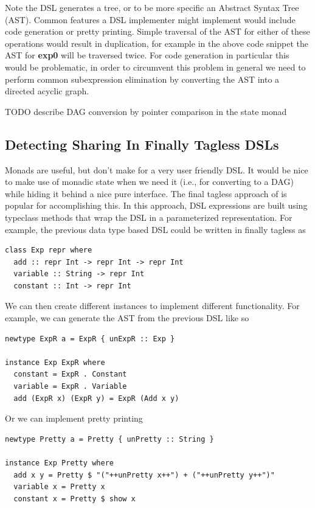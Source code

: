 \documentclass[runningheads]{llncs}
\begin{document}
Note the DSL generates a tree, or to be more specific an Abstract Syntax Tree
(AST). Common features a DSL implementer might implement would include code
generation or pretty printing. Simple traversal of the AST for either of these
operations would result in duplication, for example in the above code snippet
the AST for {\bf exp0} will be traversed twice. For code generation in
particular this would be problematic, in order to circumvent this problem in
general we need to perform common subexpression elimination by converting the
AST into a directed acyclic graph. %

TODO describe DAG conversion by pointer comparison in the state monad

\subsection{Detecting Sharing In Finally Tagless DSLs}

Monads are useful, but don't make for a very user friendly DSL. It would be nice
to make use of monadic state when we need it (i.e., for converting to a DAG)
while hiding it behind a nice pure interface. The final tagless approach of
\cite{carette:finallytagless} is popular for accomplishing this. In this
approach, DSL expressions are built using typeclass methods that wrap the DSL in
a parameterized representation. For example, the previous data type based DSL
could be written in finally tagless as

\begin{verbatim}
class Exp repr where
  add :: repr Int -> repr Int -> repr Int
  variable :: String -> repr Int
  constant :: Int -> repr Int
\end{verbatim}

We can then create different instances to implement different functionality.
For example, we can generate the AST from the previous DSL like so
\begin{verbatim}
newtype ExpR a = ExpR { unExpR :: Exp }

instance Exp ExpR where
  constant = ExpR . Constant
  variable = ExpR . Variable
  add (ExpR x) (ExpR y) = ExpR (Add x y)
\end{verbatim}

Or we can implement pretty printing
\begin{verbatim}
newtype Pretty a = Pretty { unPretty :: String }

instance Exp Pretty where
  add x y = Pretty $ "("++unPretty x++") + ("++unPretty y++")"
  variable x = Pretty x
  constant x = Pretty $ show x
\end{verbatim}
\end{document}
